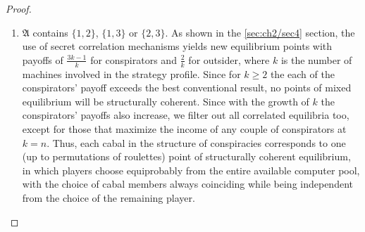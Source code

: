 \begin{proof}
\begin{enumerate}
		\item $\mathfrak{A}$ contains $\{1, 2\}$, $\{1, 3\}$ or $\{2, 3\}$. As shown in the \ref{sec:ch2/sec4} section, the use of secret correlation mechanisms yields new equilibrium points with payoffs of $\frac{3k - 1}{k}$ for conspirators and $\frac{2}{k}$ for outsider, where $k$ is the number of machines involved in the strategy profile. Since for $k \ge 2$ the each of the conspirators' payoff exceeds the best conventional result, no points of mixed equilibrium will be structurally coherent. Since with the growth of $k$ the conspirators' payoffs also increase, we filter out all correlated equilibria too, except for those that maximize the income of any couple of conspirators at $k = n$. Thus, each cabal in the structure of conspiracies corresponds to one (up to permutations of roulettes) point of structurally coherent equilibrium, in which players choose equiprobably from the entire available computer pool, with the choice of cabal members always coinciding while being independent from the choice of the remaining player. %
	\end{enumerate}
\end{proof}

